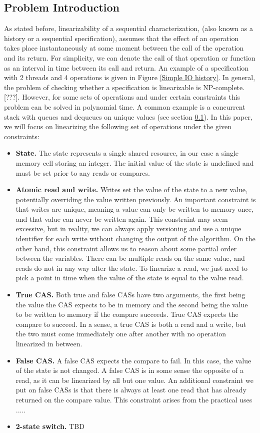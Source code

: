 \documentclass[oneside, a4paper, onecolumn, 10pt]{article}
\begin{document}
\subsection{Problem Introduction}
As stated before, linearizability of a sequential characterization, (also known as a history or a sequential specification), assumes that the effect of an operation takes place instantaneously at some moment between the call of the operation and its return. For simplicity, we can denote the call of that operation or function as an interval in time between its call and return. An example of a specification with 2 threads and 4 operations is given in Figure \ref{Simple IO history}. 
In general, the problem of checking whether a specification is linearizable is NP-complete. [???]. However, for some sets of operations and under certain constraints this problem can be solved in polynomial time. A common example is a concurrent stack with queues and dequeues on unique values (see section \ref{}). In this paper, we will focus on linearizing the following set of operations under the given constraints:
\begin{itemize}
  \item \textbf{State.} The state represents a single shared resource, in our case a single memory cell storing an integer. The initial value of the state is undefined and must be set prior to any reads or compares.
  \item \textbf{Atomic read and write.} Writes set the value of the state to a new value, potentially overriding the value written previously. An important constraint is that writes are unique, meaning a value can only be written to memory once, and that value can never be written again. This constraint may seem excessive, but in reality, we can always apply versioning and use a unique identifier for each write without changing the output of the algorithm. On the other hand, this constraint allows us to reason about some partial order between the variables. There can be multiple reads on the same value, and reads do not in any way alter the state. To linearize a read, we just need to pick a point in time when the value of the state is equal to the value read.
  \item \textbf{True CAS.} Both true and false CASs have two arguments, the first being the value the CAS expects to be in memory and the second being the value to be written to memory if the compare succeeds. True CAS expects the compare to succeed. In a sense, a true CAS is both a read and a write, but the two must come immediately one after another with no operation linearized in between. 
  \item \textbf{False CAS.} A false CAS expects the compare to fail. In this case, the value of the state is not changed. A false CAS is in some sense the opposite of a read, as it can be linearized by all but one value. An additional constraint we put on false CASs is that there is always at least one read that has already returned on the compare value. This constraint arises from the practical uses .....
  \item \textbf{2-state switch.} TBD
\end{itemize}
\end{document}
